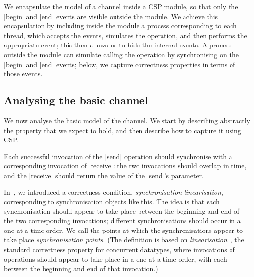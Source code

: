 We encapsulate the model of a channel inside a CSP module, so that only the
|begin| and |end| events are visible outside the module.  We achieve this
encapsulation by including inside the module a process corresponding to each
thread, which accepts the  events, simulates the operation, and
then performs the appropriate  event; this then allows us to hide
the internal events.  A process outside the module can simulate calling the
operation by synchronising on the |begin| and |end| events; below, we capture
correctness properties in terms of those events.



\subsection{Analysing the basic channel}
\label{sec:syncchan-analysis-1}

We now analyse the basic model of the channel.  We start by describing
abstractly the property that we expect to hold, and then describe how to
capture it using CSP.

Each successful invocation of the |send| operation should synchronise with a
corresponding invocation of |receive|: the two invocations should overlap in
time, and the |receive| should return the value of the |send|'s parameter.

In~\cite{LL:synchronisation}, we introduced a correctness condition,
\emph{synchronisation linearisation}, corresponding to synchronisation objects
like this.  The idea is that each synchronisation should appear to take place
between the beginning and end of the two corresponding invocations; different
synchronisations should occur in a one-at-a-time order.  We call the points at
which the synchronisations appear to take place \emph{synchronisation points}.
(The definition is based on \emph{linearisation}~\cite{herlihy-wing}, the
standard correctness property for concurrent datatypes, where invocations of
operations should appear to take place in a one-at-a-time order, with each
between the beginning and end of that invocation.)

